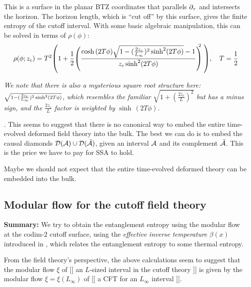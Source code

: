\documentclass[11pt,a4paper]{article}
\begin{document}
\pagebreak[3]
	
	This is a surface in the planar BTZ coordinates that parallels $\partial_{\tau}$ and intersects the horizon. The horizon length, which is ``cut off'' by this surface, gives the finite entropy of the cutoff interval.
	With some basic algebraic manipulation, this can be solved in terms of $\rho(\phi)$:
	\begin{equation}
		\rho(\phi;z_c)
		= T^2 \pqty{
			1 + \frac{1}{2} \pqty{
				\frac{
					\cosh\,(2T\phi) \sqrt{
						1 - (\frac{2z_c}{L_\infty})^2 \sinh^2 (2T\phi)
					} - 1
				}{z_c\sinh^2 (2T\phi)}
			}^{\!\!\!\!2\ }
		},\quad
		T = \frac{1}{2}
	\end{equation}
	
\textit{
	We note that there is also a mysterious square root structure here: $\mathsmaller{
		\sqrt{
			1 - (\frac{2z_c}{L_\infty})^2 \sinh^2 (2T\phi)
		}
	}$, which resembles the familiar $
		\sqrt{1 + (\frac{2z_c}{L})^2}
	$ but has a minus sign, and the $\frac{2z_c}{L}$ factor is weighted by $\sinh\,(2T\phi)$. 
}	
	
	. This seems to suggest that there is no canonical way to embed the entire time-evolved deformed field theory into the bulk. The best we can do is to embed the causal diamonds $\mathcal{D}(\mathcal{A}) \cup \mathcal{D}(\bar{\mathcal{A}})$, given an interval $\mathcal{A}$ and its complement $\bar{\mathcal{A}}$. This is the price we have to pay for SSA to hold. 
	
	Maybe we should not expect that the entire time-evolved deformed theory can be embedded into the bulk. 
	
	
\pagebreak
\subsection{Modular flow for the cutoff field theory}
\textbf{Summary:} We try to obtain the entanglement entropy using the modular flow at the \mbox{codim-2} cutoff surface, using the \textit{effective inverse temperature $\beta(x)$} introduced in \cite{Cardy:2016fqc}, which relates the entanglement entropy to some thermal entropy. 
	
	From the field theory's perspective, the above calculations seem to suggest that the modular flow $\xi$ of [[ an $L$-sized interval in the cutoff theory ]] is given by the modular flow $\xi = \xi(L_\infty)$ of [[ a CFT for an $L_\infty$ interval ]]. 
	
\end{document}
